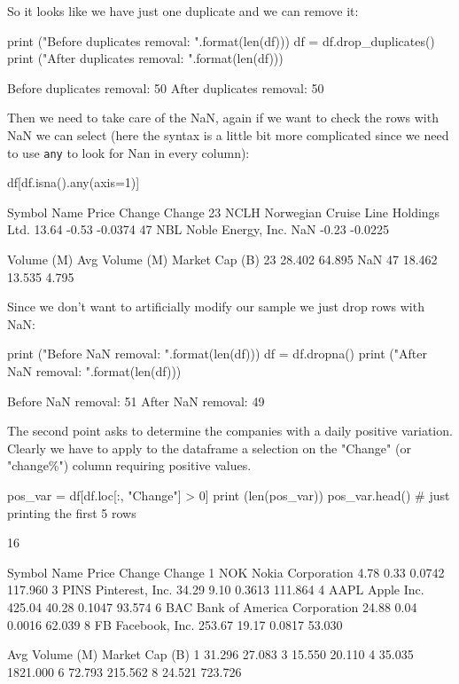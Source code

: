 So it looks like we have just one duplicate and we can remove it:

\begin{ipython}
print ("Before duplicates removal: {}".format(len(df)))
df = df.drop_duplicates()
print ("After duplicates removal: {}".format(len(df)))

Before duplicates removal: 50
After duplicates removal: 50
\end{ipython}

Then we need to take care of the NaN, again if we want to check the rows with NaN we can select (here the syntax is a little bit more complicated since we need to use \texttt{any} to look for Nan in every column):

\begin{ipython}
df[df.isna().any(axis=1)]

   Symbol                                 Name  Price  Change  Change%
23   NCLH  Norwegian Cruise Line Holdings Ltd.  13.64   -0.53  -0.0374
47    NBL                   Noble Energy, Inc.    NaN   -0.23  -0.0225

    Volume (M)  Avg Volume (M)  Market Cap (B)
23      28.402          64.895             NaN
47      18.462          13.535           4.795
\end{ipython}
        
Since we don't want to artificially modify our sample we just drop rows with NaN:

\begin{ipython}
print ("Before NaN removal: {}".format(len(df)))
df = df.dropna()
print ("After NaN removal: {}".format(len(df)))

Before NaN removal: 51
After NaN removal: 49
\end{ipython}

The second point asks to determine the companies with a daily positive variation. Clearly we have to apply to the dataframe a selection on the "Change" (or "change\%") column requiring positive values.

\begin{ipython}
pos_var = df[df.loc[:, "Change"] > 0]
print (len(pos_var))
pos_var.head() # just printing the first 5 rows

16

  Symbol                         Name   Price  Change  Change%
1    NOK            Nokia Corporation    4.78    0.33   0.0742     117.960
3   PINS              Pinterest, Inc.   34.29    9.10   0.3613     111.864
4   AAPL                   Apple Inc.  425.04   40.28   0.1047      93.574
6    BAC  Bank of America Corporation   24.88    0.04   0.0016      62.039
8     FB               Facebook, Inc.  253.67   19.17   0.0817      53.030

   Avg Volume (M)  Market Cap (B)
1          31.296          27.083
3          15.550          20.110
4          35.035        1821.000
6          72.793         215.562
8          24.521         723.726
\end{ipython}
        
